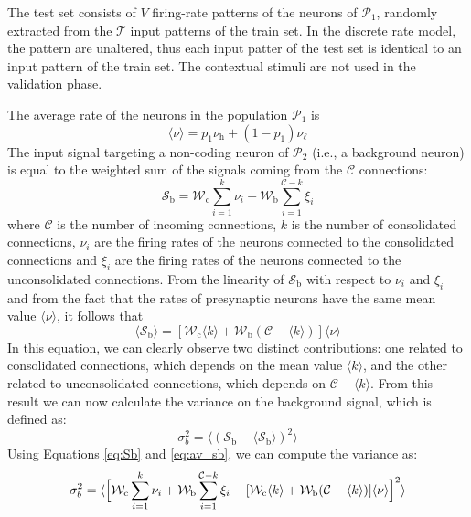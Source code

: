 \documentclass[a4paper, 12pt, twoside, openright]{book}
\newcommand{\popI}{\mathcal{P}_1}
\newcommand{\popII}{\mathcal{P}_2}
\newcommand{\T}{\mathcal{T}}
\newcommand{\rh}{\nu_\text{h}}
\newcommand{\rl}{\nu_{\ell}}
\newcommand{\C}{\mathcal{C}}
\newcommand{\Wb}{\mathcal{W}_\text{b}}
\newcommand{\Wc}{\mathcal{W}_\text{c}}
\newcommand{\Sb}{\mathcal{S}_\text{b}}
\begin{document}
The test set consists of $V$ firing-rate patterns of the neurons of $\popI$, randomly extracted from the $\T$ input patterns of the train set. In the discrete rate model, the pattern are unaltered, thus each input patter of the test set is identical to an input pattern of the train set.
The contextual stimuli are not used in the validation phase.

The average rate of the neurons in the population  $\popI$ is
\begin{equation}
\label{eq:av_r}
    \langle \nu \rangle = p_1\rh + (1-p_1)\rl
\end{equation}
The input signal targeting a non-coding neuron of $\popII$ (i.e., a background neuron) is equal to the weighted sum of the signals coming from the $\C$ connections:
\begin{equation}
\label{eq:Sb}
   \Sb = \Wc \sum_{i=1}^{ k}\nu_i +\Wb \sum_{i=1}^{\C- k } \xi_i
\end{equation}
where $\C$ is the number of incoming connections, $k$ is the number of consolidated connections, $\nu_i$ are the firing rates of the neurons connected to the consolidated connections and $\xi_i$ are the firing rates of the neurons connected to the unconsolidated connections.
From the linearity of $\Sb$ with respect to $\nu_i$ and $\xi_i$ and from the fact that the rates of presynaptic neurons have the same mean value $\langle \nu \rangle$, it follows that
\begin{equation}
\label{eq:av_sb}
    \langle \Sb \rangle = [ \Wc \langle k \rangle 
    +  \Wb (\C - \langle k \rangle) ] \langle \nu \rangle
\end{equation}
In this equation, we can clearly observe two distinct contributions: one related to consolidated connections, which depends on the mean value $\langle k \rangle$, and the other related to unconsolidated connections, which depends on $\C - \langle k \rangle$.
From this result we can now calculate the variance on the background signal, which is defined as:
\begin{equation}
     \sigma_{b}^{2}=\langle (\Sb-\langle \Sb \rangle)^2 \rangle
\end{equation}
Using Equations \eqref{eq:Sb} and \eqref{eq:av_sb}, we can compute the variance as:
\begin{equation}\label{eq:discrprelim}
    \sigma_{b}^{2}= \langle \Bigl[ \Wc \sum_{i=1}^{k}\nu_i +\Wb \sum_{i=1}^{\C-k} \xi_i 
    - [ \Wc \langle k \rangle 
    +  \Wb (\C - \langle k \rangle) ] \langle \nu \rangle \Bigr]^2 \rangle
\end{equation}
\end{document}
